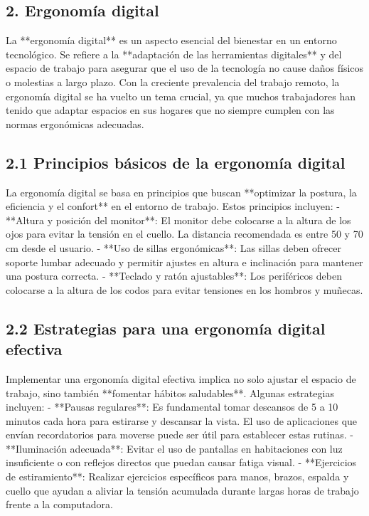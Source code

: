\documentclass[12pt]{article}
\begin{document}
\subsection{2. Ergonomía digital}
La **ergonomía digital** es un aspecto esencial del bienestar en un entorno tecnológico. Se refiere a la **adaptación de las herramientas digitales** y del espacio de trabajo para asegurar que el uso de la tecnología no cause daños físicos o molestias a largo plazo. Con la creciente prevalencia del trabajo remoto, la ergonomía digital se ha vuelto un tema crucial, ya que muchos trabajadores han tenido que adaptar espacios en sus hogares que no siempre cumplen con las normas ergonómicas adecuadas.

\subsection{2.1 Principios básicos de la ergonomía digital}
La ergonomía digital se basa en principios que buscan **optimizar la postura, la eficiencia y el confort** en el entorno de trabajo. Estos principios incluyen:
- **Altura y posición del monitor**: El monitor debe colocarse a la altura de los ojos para evitar la tensión en el cuello. La distancia recomendada es entre 50 y 70 cm desde el usuario.
- **Uso de sillas ergonómicas**: Las sillas deben ofrecer soporte lumbar adecuado y permitir ajustes en altura e inclinación para mantener una postura correcta.
- **Teclado y ratón ajustables**: Los periféricos deben colocarse a la altura de los codos para evitar tensiones en los hombros y muñecas.

\subsection{2.2 Estrategias para una ergonomía digital efectiva}
Implementar una ergonomía digital efectiva implica no solo ajustar el espacio de trabajo, sino también **fomentar hábitos saludables**. Algunas estrategias incluyen:
- **Pausas regulares**: Es fundamental tomar descansos de 5 a 10 minutos cada hora para estirarse y descansar la vista. El uso de aplicaciones que envían recordatorios para moverse puede ser útil para establecer estas rutinas.
- **Iluminación adecuada**: Evitar el uso de pantallas en habitaciones con luz insuficiente o con reflejos directos que puedan causar fatiga visual.
- **Ejercicios de estiramiento**: Realizar ejercicios específicos para manos, brazos, espalda y cuello que ayudan a aliviar la tensión acumulada durante largas horas de trabajo frente a la computadora.
\end{document}
